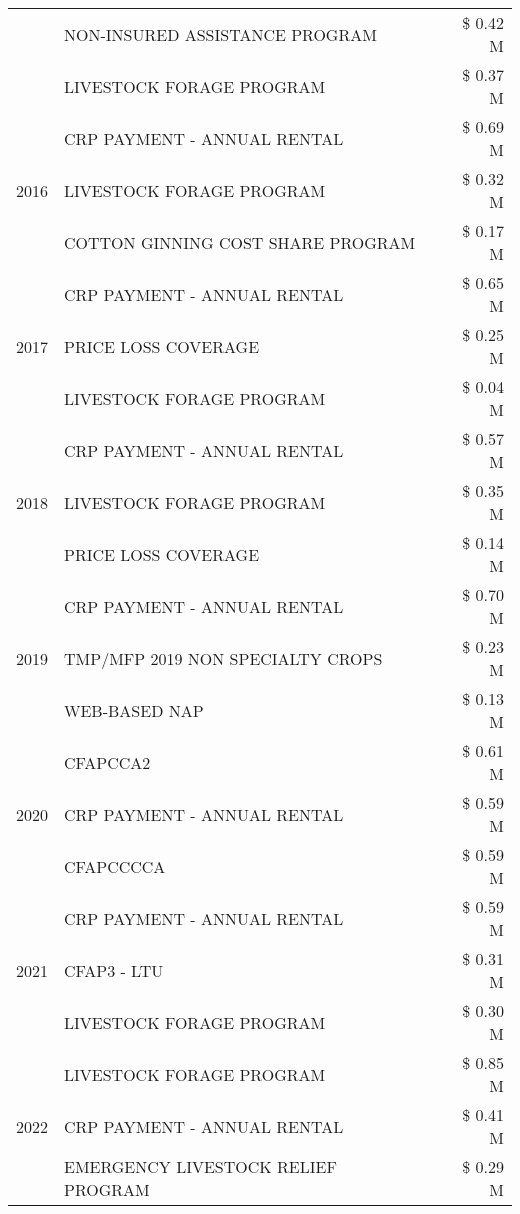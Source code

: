 \begin{tabular}{llr}
 & NON-INSURED ASSISTANCE PROGRAM & \$ 0.42 M \\
 & LIVESTOCK FORAGE PROGRAM & \$ 0.37 M \\
\cline{1-3}
\multirow[t]{3}{*}{2016} & CRP PAYMENT - ANNUAL RENTAL & \$ 0.69 M \\
 & LIVESTOCK FORAGE PROGRAM & \$ 0.32 M \\
 & COTTON GINNING COST SHARE PROGRAM & \$ 0.17 M \\
\cline{1-3}
\multirow[t]{3}{*}{2017} & CRP PAYMENT - ANNUAL RENTAL & \$ 0.65 M \\
 & PRICE LOSS COVERAGE & \$ 0.25 M \\
 & LIVESTOCK FORAGE PROGRAM & \$ 0.04 M \\
\cline{1-3}
\multirow[t]{3}{*}{2018} & CRP PAYMENT - ANNUAL RENTAL & \$ 0.57 M \\
 & LIVESTOCK FORAGE PROGRAM & \$ 0.35 M \\
 & PRICE LOSS COVERAGE & \$ 0.14 M \\
\cline{1-3}
\multirow[t]{3}{*}{2019} & CRP PAYMENT - ANNUAL RENTAL & \$ 0.70 M \\
 & TMP/MFP 2019 NON SPECIALTY CROPS & \$ 0.23 M \\
 & WEB-BASED NAP & \$ 0.13 M \\
\cline{1-3}
\multirow[t]{3}{*}{2020} & CFAPCCA2 & \$ 0.61 M \\
 & CRP PAYMENT - ANNUAL RENTAL & \$ 0.59 M \\
 & CFAPCCCCA & \$ 0.59 M \\
\cline{1-3}
\multirow[t]{3}{*}{2021} & CRP PAYMENT - ANNUAL RENTAL & \$ 0.59 M \\
 & CFAP3 - LTU & \$ 0.31 M \\
 & LIVESTOCK FORAGE PROGRAM & \$ 0.30 M \\
\cline{1-3}
\multirow[t]{3}{*}{2022} & LIVESTOCK FORAGE PROGRAM & \$ 0.85 M \\
 & CRP PAYMENT - ANNUAL RENTAL & \$ 0.41 M \\
 & EMERGENCY LIVESTOCK RELIEF PROGRAM & \$ 0.29 M \\
\cline{1-3}
\bottomrule
\end{tabular}
